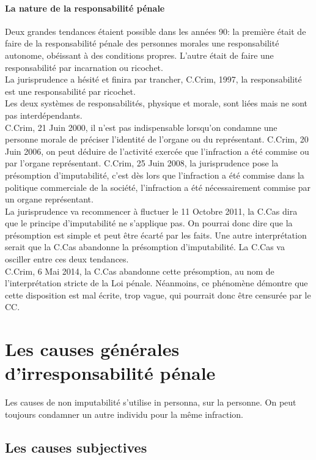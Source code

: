 \documentclass[10pt, a4paper, openany]{book}
\begin{document}
\subsubsection{La nature de la responsabilité pénale}

Deux grandes tendances étaient possible dans les années 90: la première était de faire de la responsabilité pénale des personnes morales une responsabilité autonome, obéissant à des conditions propres. L'autre était de faire une responsabilité par incarnation ou ricochet. \\
La jurisprudence a hésité et finira par trancher, C.Crim, 1997, la responsabilité est une responsabilité par ricochet. \\
Les deux systèmes de responsabilités, physique et morale, sont liées mais ne sont pas interdépendants. \\
C.Crim, 21 Juin 2000, il n'est pas indispensable lorsqu'on condamne une personne morale de préciser l'identité de l'organe ou du représentant. C.Crim, 20 Juin 2006, on peut déduire de l'activité exercée que l'infraction a été commise ou par l'organe représentant. C.Crim, 25 Juin 2008, la jurisprudence pose la présomption d'imputabilité, c'est dès lors que l'infraction a été commise dans la politique commerciale de la société, l'infraction a été nécessairement commise par un organe représentant. \\
La jurisprudence va recommencer à fluctuer le 11 Octobre 2011, la C.Cas dira que le principe d'imputabilité ne s'applique pas. On pourrai donc dire que la présomption est simple et peut être écarté par les faits. Une autre interprétation serait que la C.Cas abandonne la présomption d'imputabilité. La C.Cas va osciller entre ces deux tendances. \\
C.Crim, 6 Mai 2014, la C.Cas abandonne cette présomption, au nom de l'interprétation stricte de la Loi pénale. Néanmoins, ce phénomène démontre que cette disposition est mal écrite, trop vague, qui pourrait donc être censurée par le CC. 


\chapter{Les causes générales d'irresponsabilité pénale}

Les causes de non imputabilité s'utilise in personna, sur la personne. On peut toujours condamner un autre individu pour la même infraction. 

\section{Les causes subjectives}
\end{document}
